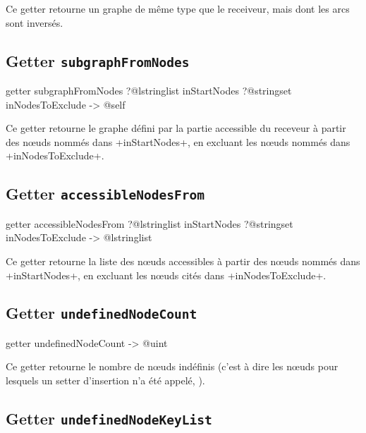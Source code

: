 Ce getter retourne un graphe de même type que le receiveur, mais dont les arcs sont inversés.





\subsection{Getter \texttt{subgraphFromNodes}}

\begin{galgas3}
getter subgraphFromNodes
  ?@lstringlist inStartNodes
  ?@stringset inNodesToExclude
  -> @self
\end{galgas3}

Ce getter retourne le graphe défini par la partie accessible du receveur à partir des nœuds nommés dans \ggst+inStartNodes+, en excluant les nœuds nommés dans \ggst+inNodesToExclude+.






\subsection{Getter \texttt{accessibleNodesFrom}}

\begin{galgas3}
getter accessibleNodesFrom
  ?@lstringlist inStartNodes
  ?@stringset inNodesToExclude
  -> @lstringlist
\end{galgas3}

Ce getter retourne la liste des nœuds accessibles à partir des nœuds nommés dans \ggst+inStartNodes+, en excluant les nœuds cités dans \ggst+inNodesToExclude+.






\subsection{Getter \texttt{undefinedNodeCount}}

\begin{galgas3}
getter undefinedNodeCount -> @uint
\end{galgas3}

Ce getter retourne le nombre de nœuds indéfinis (c'est à dire les nœuds pour lesquels un setter d'insertion n'a été appelé, ).







\subsection{Getter \texttt{undefinedNodeKeyList}}

